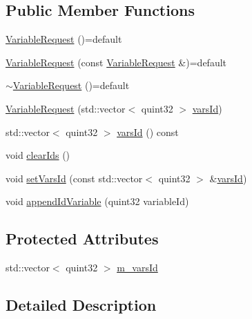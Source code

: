 \subsection*{Public Member Functions}
\begin{DoxyCompactItemize}
\item 
\hyperlink{class_a_h_p_1_1_variable_request_ad2e05cd109e77264e6558ce925b9f292}{Variable\+Request} ()=default
\item 
\hyperlink{class_a_h_p_1_1_variable_request_a9b56193dcec29d97118b7d5c97b91bd2}{Variable\+Request} (const \hyperlink{class_a_h_p_1_1_variable_request}{Variable\+Request} \&)=default
\item 
\hyperlink{class_a_h_p_1_1_variable_request_ac1c53a02d67c4359d3c817b7db3f69e2}{$\sim$\+Variable\+Request} ()=default
\item 
\hyperlink{class_a_h_p_1_1_variable_request_ae0536663ee106a16a63bde997a5c46fc}{Variable\+Request} (std\+::vector$<$ quint32 $>$ \hyperlink{class_a_h_p_1_1_variable_request_aa780d24b9259856ada9419e90eaa8225}{vars\+Id})
\item 
std\+::vector$<$ quint32 $>$ \hyperlink{class_a_h_p_1_1_variable_request_aa780d24b9259856ada9419e90eaa8225}{vars\+Id} () const 
\item 
void \hyperlink{class_a_h_p_1_1_variable_request_aff0135c084fb564fd783a507555be578}{clear\+Ids} ()
\item 
void \hyperlink{class_a_h_p_1_1_variable_request_a2cd3508128c52ee36f58cfd7c29c9850}{set\+Vars\+Id} (const std\+::vector$<$ quint32 $>$ \&\hyperlink{class_a_h_p_1_1_variable_request_aa780d24b9259856ada9419e90eaa8225}{vars\+Id})
\item 
void \hyperlink{class_a_h_p_1_1_variable_request_a941a7beb4adc57fdaaf6890508c1aef0}{append\+Id\+Variable} (quint32 variable\+Id)
\end{DoxyCompactItemize}
\subsection*{Protected Attributes}
\begin{DoxyCompactItemize}
\item 
std\+::vector$<$ quint32 $>$ \hyperlink{class_a_h_p_1_1_variable_request_a4bc80cb39c5d8778765de922dce4ebae}{m\+\_\+vars\+Id}
\end{DoxyCompactItemize}


\subsection{Detailed Description}


